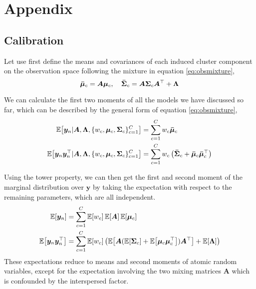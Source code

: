 \documentclass{article}
\newcommand{\mix}{\bm{A}}
\newcommand{\obs}{y}
\newcommand{\obsvec}{\bm{\obs}}
\newcommand{\noisecov}{\bm{\Lambda}}
\newcommand{\obsmean}{\bar{\mu}}
\newcommand{\obsmeanvec}{\bm{\obsmean}}
\newcommand{\obscov}{\bm{\bar{\Sigma}}}
\newcommand{\mean}{\mu}
\newcommand{\meanvec}{\bm{\mean}}
\newcommand{\weight}{w}
\newcommand{\compweight}{{\weight}}
\newcommand{\compmeanvec}{{\meanvec}}
\newcommand{\compcov}{{\bm{\Sigma}}}
\newcommand{\numcluster}{C}
\newcommand{\icluster}{c}
\begin{document}
\appendix
\section{Appendix}

\subsection{Calibration} 
Let use first define the means and covariances of each induced cluster component on the observation space following the mixture in equation \eqref{eq:obsmixture},
\begin{equation}
\obsmeanvec_\icluster=\mix \compmeanvec_\icluster,\quad \obscov_{\icluster}=\mix\compcov_\icluster\mix\T+\noisecov
\end{equation}


We can calculate the first two moments of all the models we have discussed so far, which can be described by the general form of equation \eqref{eq:obsmixture},
\begin{align*}
\E{\obsvec_n\cond \mix,\noisecov,\lbrace \compweight_\icluster,\compmeanvec_\icluster,\compcov_\icluster\rbrace_{\icluster=1}^{\numcluster}}&=\sum_{\icluster=1}^{\numcluster}\compweight_{\icluster}\obsmeanvec_{\icluster}\\
\E{\obsvec_n\obsvec_n\T\cond \mix,\noisecov,\lbrace \compweight_\icluster,\compmeanvec_\icluster,\compcov_\icluster\rbrace_{\icluster=1}^{\numcluster}}&=\sum_{\icluster=1}^{\numcluster}\compweight_\icluster\left(\obscov_\icluster + \obsmeanvec_{\icluster}\obsmeanvec_{\icluster}\T\right)
\end{align*}

Using the tower property, we can then get the first and second moment of the marginal distribution over $\obsvec$ by taking the expectation with respect to the remaining parameters, which are all independent.
\begin{align}
\E{\obsvec_n}&=\sum_{\icluster=1}^{\numcluster}\E{\compweight_\icluster}\E{\mix}\E{\compmeanvec_\icluster}\\
\E{\obsvec_n\obsvec_n\T}&=\sum_{\icluster=1}^{\numcluster}\E{\compweight_\icluster}\left(\E{\mix(\E{\compcov_\icluster}+\E{\compmeanvec_\icluster\compmeanvec_\icluster\T})\mix\T}+\E{\noisecov}\right)
\end{align}
These expectations reduce to means and second moments of atomic random variables, except for the expectation involving the two mixing matrices $\mix$ which is confounded by the interspersed factor.
\end{document}
